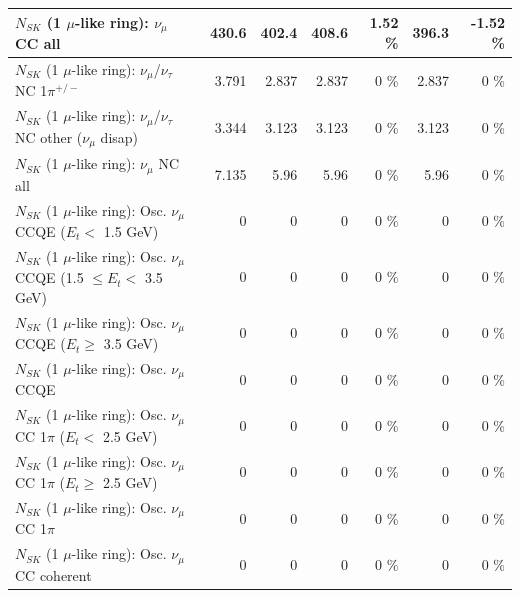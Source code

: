 \begin{table}
\begin{tabular}{| l | r | r | r  r | r  r |}
                                $N_{SK}$ (1 $\mu$-like ring): $\nu_{\mu}$ CC all &           430.6 &           402.4 &           408.6 &     1.52 \%  &           396.3 &    -1.52 \%  \\ 
\hline
              $N_{SK}$ (1 $\mu$-like ring): $\nu_\mu$/$\nu_\tau$ NC 1$\pi^{+/-}$ &           3.791 &           2.837 &           2.837 &        0 \%  &           2.837 &        0 \%  \\ 
   $N_{SK}$ (1 $\mu$-like ring): $\nu_\mu$/$\nu_\tau$ NC other ($\nu_\mu$ disap) &           3.344 &           3.123 &           3.123 &        0 \%  &           3.123 &        0 \%  \\ 
                                $N_{SK}$ (1 $\mu$-like ring): $\nu_{\mu}$ NC all &           7.135 &            5.96 &            5.96 &        0 \%  &            5.96 &        0 \%  \\ 
\hline
\hline
           $N_{SK}$ (1 $\mu$-like ring): Osc. $\nu_\mu$ CCQE ($E_{t} <$ 1.5 GeV) &               0 &               0 &               0 &        0 \%  &               0 &        0 \%  \\ 
  $N_{SK}$ (1 $\mu$-like ring): Osc. $\nu_\mu$ CCQE (1.5 $\leq E_{t} <$ 3.5 GeV) &               0 &               0 &               0 &        0 \%  &               0 &        0 \%  \\ 
        $N_{SK}$ (1 $\mu$-like ring): Osc. $\nu_\mu$ CCQE ($E_{t} \geq$ 3.5 GeV) &               0 &               0 &               0 &        0 \%  &               0 &        0 \%  \\ 
\hline
                               $N_{SK}$ (1 $\mu$-like ring): Osc. $\nu_\mu$ CCQE &               0 &               0 &               0 &        0 \%  &               0 &        0 \%  \\ 
\hline
      $N_{SK}$ (1 $\mu$-like ring): Osc. $\nu_\mu$ CC 1$\pi$ ($E_{t} <$ 2.5 GeV) &               0 &               0 &               0 &        0 \%  &               0 &        0 \%  \\ 
   $N_{SK}$ (1 $\mu$-like ring): Osc. $\nu_\mu$ CC 1$\pi$ ($E_{t} \geq$ 2.5 GeV) &               0 &               0 &               0 &        0 \%  &               0 &        0 \%  \\ 
\hline
                          $N_{SK}$ (1 $\mu$-like ring): Osc. $\nu_\mu$ CC 1$\pi$ &               0 &               0 &               0 &        0 \%  &               0 &        0 \%  \\ 
                        $N_{SK}$ (1 $\mu$-like ring): Osc. $\nu_\mu$ CC coherent &               0 &               0 &               0 &        0 \%  &               0 &        0 \%  \\ 

\end{tabular}
\end{table}
